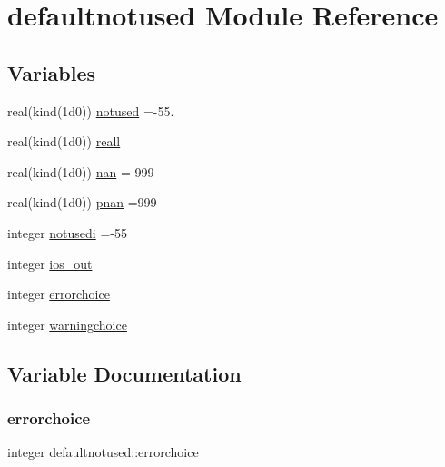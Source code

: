 \hypertarget{namespacedefaultnotused}{}\section{defaultnotused Module Reference}
\label{namespacedefaultnotused}
\subsection*{Variables}
\begin{DoxyCompactItemize}
\item 
real(kind(1d0)) \hyperlink{namespacedefaultnotused_a71e2d536a1c83e98103c3ed183c303cd}{notused} =-\/55.
\item 
real(kind(1d0)) \hyperlink{namespacedefaultnotused_acc4adc83f26d421a6b79e44ae8a57896}{reall}
\item 
real(kind(1d0)) \hyperlink{namespacedefaultnotused_a9ad6683bfdf839485292f0be53501f07}{nan} =-\/999
\item 
real(kind(1d0)) \hyperlink{namespacedefaultnotused_abe169835df07a0da3ef05d9386ac49e8}{pnan} =999
\item 
integer \hyperlink{namespacedefaultnotused_afd5393d7b0bd5eadd9ebcf66bd974e0d}{notusedi} =-\/55
\item 
integer \hyperlink{namespacedefaultnotused_a94842c2506c0ba5662c919686e38efcc}{ios\+\_\+out}
\item 
integer \hyperlink{namespacedefaultnotused_ab415a3fec9b36b33c186cb4576c31730}{errorchoice}
\item 
integer \hyperlink{namespacedefaultnotused_afca6daa7573cc38632f70be01568f266}{warningchoice}
\end{DoxyCompactItemize}


\subsection{Variable Documentation}
\mbox{\label{namespacedefaultnotused_ab415a3fec9b36b33c186cb4576c31730}} 
\subsubsection{\texorpdfstring{errorchoice}{errorchoice}}
{\footnotesize\ttfamily integer defaultnotused\+::errorchoice}



